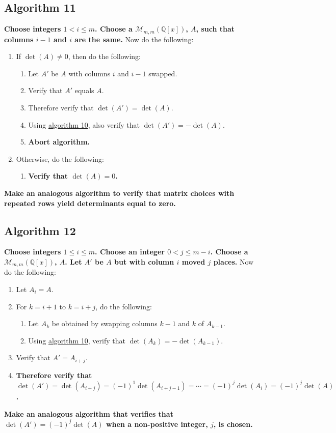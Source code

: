 \documentclass[twocolumn]{article}
\begin{document}
		\subsection{Algorithm 11}\label{sec:algorithm 11}
			\textbf{Choose integers $1<i\le m$. Choose a $\mathcal{M}_{m,m}(\mathbb{Q}[x])$, $A$, such that columns $i-1$ and $i$ are the same.} Now do the following:
			\begin{enumerate}
				\item If $\det(A)\ne 0$, then do the following:
				\begin{enumerate}
					\item Let $A'$ be $A$ with columns $i$ and $i-1$ swapped.
					\item Verify that $A'$ equals $A$.
					\item Therefore verify that $\det(A')=\det(A)$.
					\item Using \hyperref[sec:algorithm 10]{algorithm 10}, also verify that $\det(A')=-\det(A)$.
					\item \textbf{Abort algorithm.}
				\end{enumerate}
				\item Otherwise, do the following:
				\begin{enumerate}
					\item \textbf{Verify that $\det(A)=0$.}
				\end{enumerate}
			\end{enumerate}
			\textbf{Make an analogous algorithm to verify that matrix choices with repeated rows yield determinants equal to zero.}
		\subsection{Algorithm 12}\label{sec:algorithm 12}
			\textbf{Choose integers $1\le i\le m$. Choose an integer $0<j\le m-i$. Choose a $\mathcal{M}_{m,m}(\mathbb{Q}[x])$, $A$. Let $A'$ be $A$ but with column $i$ moved $j$ places.} Now do the following:
			\begin{enumerate}
				\item Let $A_i=A$.
				\item For $k=i+1$ to $k=i+j$, do the following:
				\begin{enumerate}
					\item Let $A_k$ be obtained by swapping columns $k-1$ and $k$ of $A_{k-1}$.
					\item Using \hyperref[sec:algorithm 10]{algorithm 10}, verify that $\det(A_k)=-\det(A_{k-1})$.
				\end{enumerate}
				\item Verify that $A'=A_{i+j}$.
				\item \textbf{Therefore verify that $\det(A')=\det(A_{i+j})=(-1)^1\det(A_{i+j-1})=\cdots=(-1)^j\det(A_{i})=(-1)^j\det(A)$.}
			\end{enumerate}
			\textbf{Make an analogous algorithm that verifies that $\det(A')=(-1)^j\det(A)$ when a non-positive integer, $j$, is chosen.}
			
\end{document}

